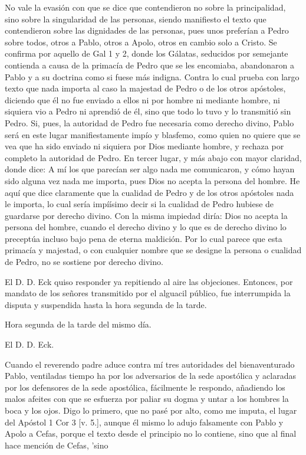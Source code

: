 No vale la evasión con que se dice que contendieron no sobre la principalidad, sino sobre la singularidad de las personas, siendo manifiesto el texto que contendieron sobre las dignidades de las personas, pues unos preferían a Pedro sobre todos, otros a Pablo, otros a Apolo, otros en cambio solo a Cristo. Se confirma por aquello de Gal 1 y 2, donde los Gálatas, seducidos por semejante contienda a causa de la primacía de Pedro que se les encomiaba, abandonaron a Pablo y a su doctrina como si fuese más indigna. Contra lo cual prueba con largo texto que nada importa al caso la majestad de Pedro o de los otros apóstoles, diciendo que él no fue enviado a ellos ni por hombre ni mediante hombre, ni siquiera vio a Pedro ni aprendió de él, sino que todo lo tuvo y lo transmitió sin Pedro. Si, pues, la autoridad de Pedro fue necesaria como derecho divino, Pablo será en este lugar manifiestamente impío y blasfemo, como quien no quiere que se vea que ha sido enviado ni siquiera por Dios mediante hombre, y rechaza por completo la autoridad de Pedro. En tercer lugar, y más abajo con mayor claridad, donde dice: A mí los que parecían ser algo nada me comunicaron, y cómo hayan sido alguna vez nada me importa, pues Dios no acepta la persona del hombre. He aquí que dice claramente que la cualidad de Pedro y de los otros apóstoles nada le importa, lo cual sería impíísimo decir si la cualidad de Pedro hubiese de guardarse por derecho divino. Con la misma impiedad diría: Dios no acepta la persona del hombre, cuando el derecho divino y lo que es de derecho divino lo preceptúa incluso bajo pena de eterna maldición. Por lo cual parece que esta primacía y majestad, o con cualquier nombre que se designe la persona o cualidad de Pedro, no se sostiene por derecho divino.

El D. D. Eck quiso responder ya repitiendo al aire las objeciones. Entonces, por mandato de los señores transmitido por el alguacil público, fue interrumpida la disputa y suspendida hasta la hora segunda de la tarde.

Hora segunda de la tarde del mismo día.

El D. D. Eck.

Cuando el reverendo padre aduce contra mí tres autoridades del bienaventurado Pablo, ventiladas tiempo ha por los adversarios de la sede apostólica y aclaradas por los defensores de la sede apostólica, fácilmente le respondo, añadiendo los malos afeites con que se esfuerza por paliar su dogma y untar a los hombres la boca y los ojos. Digo lo primero, que no pasé por alto, como me imputa, el lugar del Apóstol 1 Cor 3 [v. 5.], aunque él mismo lo adujo falsamente con Pablo y Apolo a Cefas, porque el texto desde el principio no lo contiene, sino que al final hace mención de Cefas, 'sino

